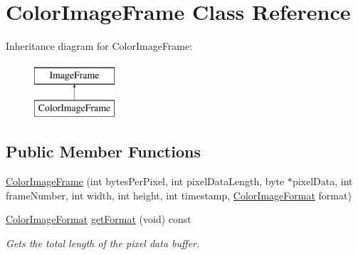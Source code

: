 \hypertarget{class_color_image_frame}{\section{\-Color\-Image\-Frame \-Class \-Reference}
\label{class_color_image_frame}
}
\-Inheritance diagram for \-Color\-Image\-Frame\-:\begin{figure}[H]
\begin{center}
\leavevmode
\includegraphics[height=2.000000cm]{class_color_image_frame}
\end{center}
\end{figure}
\subsection*{\-Public \-Member \-Functions}
\begin{DoxyCompactItemize}
\item 
\hyperlink{class_color_image_frame_a929a2ce400f9f59d56504974446502eb}{\-Color\-Image\-Frame} (int bytes\-Per\-Pixel, int pixel\-Data\-Length, byte $\ast$pixel\-Data, int frame\-Number, int width, int height, int timestamp, \hyperlink{color_image_format_8h_a77f719572c3c368859dd2ec3153d8452}{\-Color\-Image\-Format} format)
\item 
\hyperlink{color_image_format_8h_a77f719572c3c368859dd2ec3153d8452}{\-Color\-Image\-Format} \hyperlink{class_color_image_frame_ae68b77266e5a2de4b72fb55adc2bbdf4}{get\-Format} (void) const 
\begin{DoxyCompactList}\small\item\em \-Gets the total length of the pixel data buffer. \end{DoxyCompactList}\end{DoxyCompactItemize}


